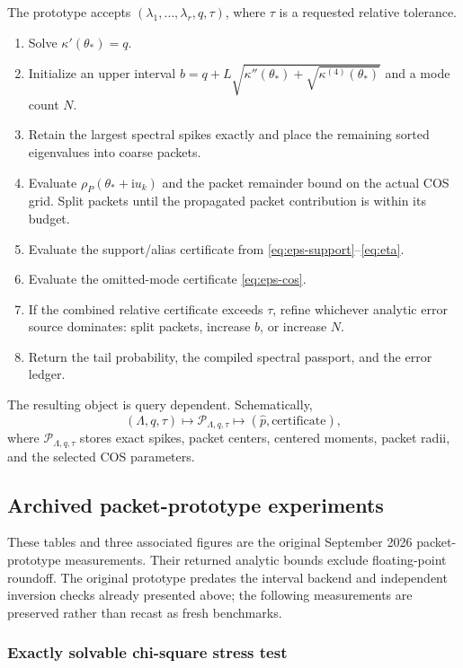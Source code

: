 \documentclass[11pt]{article}
\theoremstyle{definition}
\theoremstyle{remark}
\newcommand{\ii}{\mathrm{i}}
\begin{document}
The prototype accepts $(\lambda_1,\ldots,\lambda_r,q,\tau)$, where $\tau$ is a requested relative tolerance.

\begin{enumerate}[leftmargin=2em]
\item Solve $\kappa'(\theta_*)=q$.
\item Initialize an upper interval $b=q+L\sqrt{\kappa''(\theta_*)+\sqrt{\kappa^{(4)}(\theta_*)}}$ and a mode count $N$.
\item Retain the largest spectral spikes exactly and place the remaining sorted eigenvalues into coarse packets.
\item Evaluate $\rho_P(\theta_*+\ii u_k)$ and the packet remainder bound on the actual COS grid. Split packets until the propagated packet contribution is within its budget.
\item Evaluate the support/alias certificate from \eqref{eq:eps-support}--\eqref{eq:eta}.
\item Evaluate the omitted-mode certificate \eqref{eq:eps-cos}.
\item If the combined relative certificate exceeds $\tau$, refine whichever analytic error source dominates: split packets, increase $b$, or increase $N$.
\item Return the tail probability, the compiled spectral passport, and the error ledger.
\end{enumerate}

The resulting object is query dependent. Schematically,
\begin{equation}
(\Lambda,q,\tau)
\longmapsto
\mathcal P_{\Lambda,q,\tau}
\longmapsto
(\widehat p,\text{certificate}),
\label{eq:compiler-map}
\end{equation}
where $\mathcal P_{\Lambda,q,\tau}$ stores exact spikes, packet centers, centered moments, packet radii, and the selected COS parameters.

\subsection{Archived packet-prototype experiments}
These tables and three associated figures are the original September 2026
packet-prototype measurements.  Their returned analytic bounds exclude
floating-point roundoff.  The original prototype predates the interval
backend and independent inversion checks already presented above; the
following measurements are preserved rather than recast as fresh benchmarks.

\subsubsection{Exactly solvable chi-square stress test}
\end{document}
